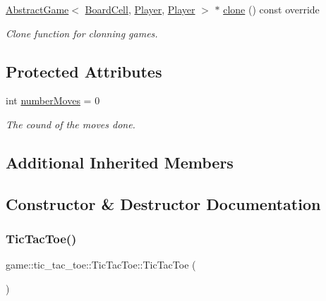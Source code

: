 \begin{DoxyCompactItemize}
\item 
\hyperlink{classgame_1_1_abstract_game}{Abstract\+Game}$<$ \hyperlink{classgame_1_1tic__tac__toe_1_1_board_cell}{Board\+Cell}, \hyperlink{classgame_1_1tic__tac__toe_1_1_player}{Player}, \hyperlink{classgame_1_1tic__tac__toe_1_1_player}{Player} $>$ $\ast$ \hyperlink{classgame_1_1tic__tac__toe_1_1_tic_tac_toe_a11f31f44ee9ebe8c394bcc9f2a74fab4}{clone} () const override
\begin{DoxyCompactList}\small\item\em Clone function for clonning games. \end{DoxyCompactList}\end{DoxyCompactItemize}
\subsection*{Protected Attributes}
\begin{DoxyCompactItemize}
\item 
int \hyperlink{classgame_1_1tic__tac__toe_1_1_tic_tac_toe_aa4d91a411bde0547ce24551f61f4772b}{number\+Moves} = 0
\begin{DoxyCompactList}\small\item\em The cound of the moves done. \end{DoxyCompactList}\end{DoxyCompactItemize}
\subsection*{Additional Inherited Members}


\subsection{Constructor \& Destructor Documentation}
\mbox{\label{classgame_1_1tic__tac__toe_1_1_tic_tac_toe_a93cde8c52c356cd36a622d33964596d8}} 
\subsubsection{\texorpdfstring{Tic\+Tac\+Toe()}{TicTacToe()}}
{\footnotesize\ttfamily game\+::tic\+\_\+tac\+\_\+toe\+::\+Tic\+Tac\+Toe\+::\+Tic\+Tac\+Toe (\begin{DoxyParamCaption}{ }\end{DoxyParamCaption})\hspace{0.3cm}{\ttfamily [explicit]}}

